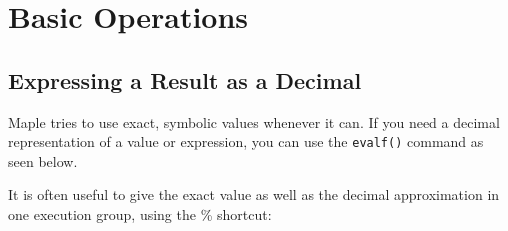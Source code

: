 \chapter{Basic Operations}
\label{chp:basic_operations}

\section{Expressing a Result as a Decimal}

Maple tries to use exact, symbolic values whenever it can. If you need a decimal representation of a value or expression, you can use the \texttt{evalf()} command as seen below.


\begin{maplegroup}
\begin{mapleinput}
\end{mapleinput}
\mapleresult
\begin{maplelatex}
\end{maplelatex}
\end{maplegroup}

\begin{maplegroup}
\begin{mapleinput}
\end{mapleinput}
\mapleresult
\begin{maplelatex}
\end{maplelatex}
\end{maplegroup}


It is often useful to give the exact value as well as the decimal approximation in one execution group, using the \% shortcut: 

\begin{maplegroup}
\begin{mapleinput}
\end{mapleinput}
\mapleresult
\begin{maplelatex}
\end{maplelatex}
\begin{maplelatex}
\end{maplelatex}
\end{maplegroup}

